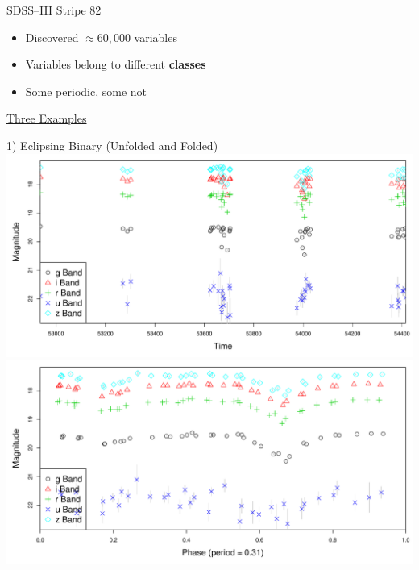 \documentclass[12pt]{beamer}
\begin{document}
\begin{frame}{SDSS--III Stripe 82}
\begin{itemize}
\item Discovered $\approx 60,000$ variables
\item Variables belong to different \textbf{classes}
\item Some periodic, some not
\end{itemize}

\underline{Three Examples}

\vspace{-.1in}

\begin{center}
{\small 1) Eclipsing Binary (Unfolded and Folded)}\\
\includegraphics[scale=.15]{figs/unfolded_4183016.pdf}
\includegraphics[scale=.15]{figs/folded_4183016.pdf}
\end{center}

\vspace{-.2in}




\end{frame}
\end{document}
